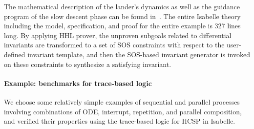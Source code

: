\documentclass[runningheads,a4paper]{llncs}
\begin{document}
The mathematical description of the lander's dynamics as well as the
guidance program of the slow descent phase can be found
in~\cite{ZYZG14,ZhanWZ16}. The entire Isabelle theory including the
model, specification, and proof for the entire example is 327 lines
long. By applying HHL prover, the unproven subgoals related to
differential invariants are transformed to a set of SOS constraints
with respect to the user-defined invariant template, and then the
SOS-based invariant generator is invoked on these constraints to
synthesize a satisfying invariant.

\paragraph{Example: benchmarks for trace-based logic}

We choose some relatively simple examples of sequential and parallel processes involving combinations of ODE, interrupt, repetition, and parallel composition, and verified their properties using the trace-based logic for HCSP in Isabelle.



\end{document}
